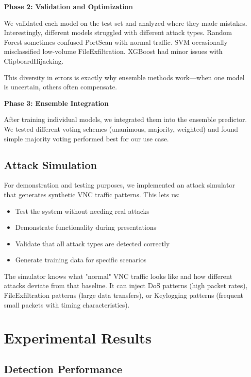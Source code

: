 \documentclass[conference]{IEEEtran}
\begin{document}
\textbf{Phase 2: Validation and Optimization}

We validated each model on the test set and analyzed where they made mistakes. Interestingly, different models struggled with different attack types. Random Forest sometimes confused PortScan with normal traffic. SVM occasionally misclassified low-volume FileExfiltration. XGBoost had minor issues with ClipboardHijacking.

This diversity in errors is exactly why ensemble methods work—when one model is uncertain, others often compensate.

\textbf{Phase 3: Ensemble Integration}

After training individual models, we integrated them into the ensemble predictor. We tested different voting schemes (unanimous, majority, weighted) and found simple majority voting performed best for our use case.

\subsection{Attack Simulation}

For demonstration and testing purposes, we implemented an attack simulator that generates synthetic VNC traffic patterns. This lets us:

\begin{itemize}
\item Test the system without needing real attacks
\item Demonstrate functionality during presentations
\item Validate that all attack types are detected correctly
\item Generate training data for specific scenarios
\end{itemize}

The simulator knows what "normal" VNC traffic looks like and how different attacks deviate from that baseline. It can inject DoS patterns (high packet rates), FileExfiltration patterns (large data transfers), or Keylogging patterns (frequent small packets with timing characteristics).

\section{Experimental Results}

\subsection{Detection Performance}
\end{document}
